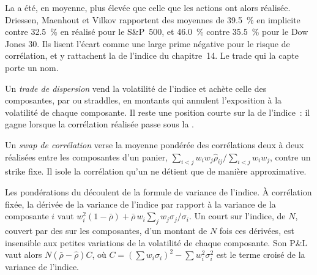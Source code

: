 La  a été, en moyenne, plus élevée que celle que les actions ont alors réalisée. Driessen, Maenhout et Vilkov
rapportent des moyennes de 39.5~\% en implicite contre 32.5~\% en réalisé pour le S\&P~500, et 46.0~\% contre 35.5~\% pour le Dow Jones
30. Ils lisent l'écart comme une large prime négative pour le risque de corrélation, et y rattachent la  de l'indice
du chapitre~14. Le trade qui la capte porte un nom.

\begin{definition}\label{def:dv:multi-asset-options:dispersion}
Un \emph{trade de dispersion} vend la volatilité de l'indice et achète celle des composantes, par 
ou straddles, en montants qui annulent l'exposition à la volatilité de chaque composante. Il reste une position courte sur
la  de l'indice~: il gagne lorsque la corrélation réalisée passe sous la .
\end{definition}

\begin{definition}\label{def:dv:multi-asset-options:corrswap}
Un \emph{swap de corrélation} verse la moyenne pondérée des corrélations deux à deux réalisées
entre les composantes d'un panier, $\sum_{i<j}w_iw_j\hat\rho_{ij}/\sum_{i<j}w_iw_j$, contre un strike fixe. Il isole la
corrélation qu'un  ne détient que de manière approximative.
\end{definition}

Les pondérations du  découlent de la formule de variance de l'indice. À corrélation fixée, la dérivée de la
variance de l'indice par rapport à la variance de la composante $i$ vaut
$w_i^2(1-\bar\rho)+\bar\rho\,w_i\sum_jw_j\sigma_j/\sigma_i$. Un  court sur l'indice, de  $N$,
couvert par des  sur les composantes, d'un montant de $N$ fois ces dérivées, est insensible aux petites variations de la
volatilité de chaque composante. Son P\&L vaut alors $N(\bar\rho-\hat\rho)C$, où $C=(\sum w_i\sigma_i)^2-\sum w_i^2\sigma_i^2$ est le
terme croisé de la variance de l'indice.

